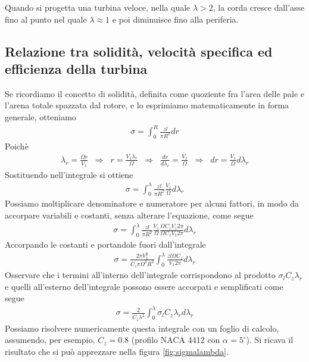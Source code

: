 Quando si progetta una turbina veloce, nella quale $\lambda > 2$, la corda cresce dall'asse fino al punto nel quale $\lambda \approx 1$ e poi diminuisce fino alla periferia. 

\subsection{Relazione tra solidità, velocità specifica ed efficienza della turbina}
Se ricordiamo il concetto di solidità, definita come quoziente fra l'area delle pale e l'arena totale spazzata dal rotore, e lo esprimiamo matematicamente in forma generale, otteniamo
\begin{align*}
\sigma = \int_0^R \frac{z l }{\pi R^2} dr
\end{align*}
Poichè
\begin{align*}
\lambda_r = \frac{\Omega r}{V_1} \;\; \Rightarrow \;\; r = \frac{V_1 \lambda_r}{\Omega} \;\; \Rightarrow \;\; \frac{dr}{d \lambda_r} = \frac{V_1}{\Omega} \;\; \Rightarrow \;\; dr = \frac{V_1}{\Omega} d\lambda_r
\end{align*}
Sostituendo nell'integrale si ottiene
\begin{align*}
\sigma = \int_0^{\lambda} \frac{z l}{\pi R^2} \frac{V_1}{\Omega} d\lambda_r
\end{align*}
Possiamo moltiplicare denominatore e numeratore per alcuni fattori, in modo da accorpare variabili e costanti, senza alterare l'equazione, come segue
\begin{align*}
\sigma = \int_0^{\lambda} \frac{z l}{\pi R^2} \frac{V_1}{\Omega} \frac{\Omega C_z V_1 2 \pi}{\Omega C_z V_1 2 \pi} d \lambda_r
\end{align*}
Accorpando le costanti e portandole fuori dall'integrale
\begin{align*}
\sigma = \frac{2 \pi V_1^2}{C_z \pi \Omega^2 R^2} \int_0^{\lambda} \frac{z l \Omega C_z}{V_1 2 \pi} d \lambda_r
\end{align*}
Osservare che i termini all'interno dell'integrale corrispondono al prodotto $\sigma_l C_z \lambda_r$ e quelli all'esterno dell'integrale possono essere accorpati e semplificati come segue
\begin{align*}
\sigma = \frac{2}{C_z \lambda^2} \int_0^{\lambda} \sigma_l C_z \lambda_r d \lambda_r
\end{align*}
Possiamo risolvere numericamente questa integrale con un foglio di calcolo, assumendo, per esempio, $C_z = 0.8$ (profilo NACA 4412 con $\alpha = 5^\circ$). Si ricava il risultato che si può apprezzare nella figura \ref{fig:sigmalambda}.
